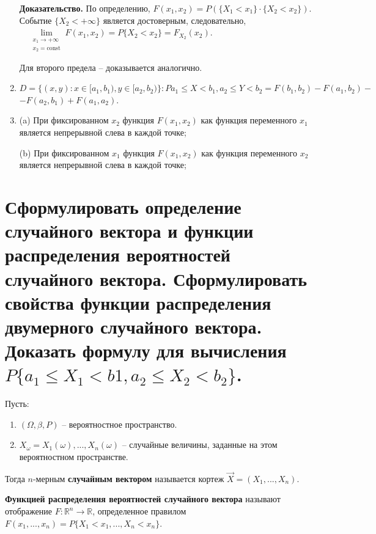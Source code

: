 \begin{enumerate}
		\textbf{Доказательство.} По определению, \( F(x_1, x_2) = P(\{X_1 < x_1\} \cdot \{X_2 < x_2\})\). Событие $\{X_2 < +\infty\}$ является достоверным, следовательно, $\quad \lim\limits_{{\substack{x_1 \to +\infty \\ x_2 = \text{const}}}} F(x_1, x_2) = P\{X_2 < x_2\} = F_{X_2}(x_2)$. 
		
		Для второго предела -- доказывается аналогично.
		
	\item $D = \{(x, y): x \in [a_1, b_1), y \in [a_2, b_2)\}: P{a_1 \leq X < b_1, a_2 \leq Y < b_2} = F(b_1, b_2) - F(a_1, b_2) -$ $-F(a_2, b_1) + F(a_1, a_2)$.
	
	\item (a) При фиксированном $x_2$ функция $F(x_1, x_2)$ как функция переменного $x_1$
	является непрерывной слева в каждой точке;
	
	(b) При фиксированном $x_1$ функция $F(x_1, x_2)$ как функция переменного $x_2$
	является непрерывной слева в каждой точке;
	
\end{enumerate}


\section{Сформулировать определение случайного вектора и функции распределения вероятностей случайного вектора. Сформулировать свойства функции распределения двумерного случайного вектора. Доказать формулу для вычисления $P\{a_1 \leq X_1 < b1, a_2 \leq X_2 < b_2\}$.}

Пусть: 
\begin{enumerate}
	\item $(\Omega, \beta, P)$ -- вероятностное пространство.
	
	\item $X_{\omega} = X_1(\omega),...,X_n(\omega)$ -- случайные величины, заданные на этом вероятностном пространстве.
\end{enumerate}
Тогда $n$-мерным \textbf{случайным вектором} называется кортеж $\vec{X} = (X_1,..., X_n)$.

\textbf{Функцией распределения вероятностей случайного вектора} называют отображение $F: \mathbb{R}^n \rightarrow \mathbb{R}$, определенное правилом $F(x_1, ..., x_n) = P\{X_1 < x_1,..., X_n < x_n\}$.

